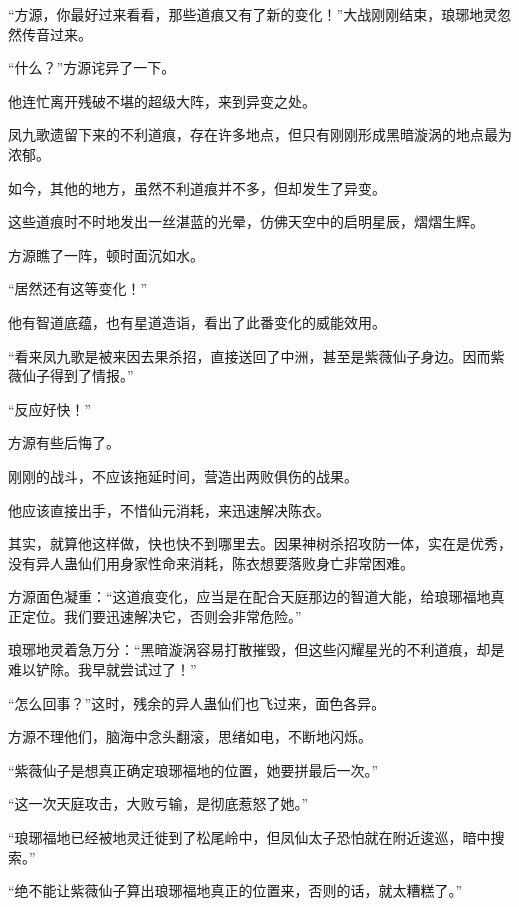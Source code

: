 
\begin{this_body}



“方源，你最好过来看看，那些道痕又有了新的变化！”大战刚刚结束，琅琊地灵忽然传音过来。

“什么？”方源诧异了一下。

他连忙离开残破不堪的超级大阵，来到异变之处。

凤九歌遗留下来的不利道痕，存在许多地点，但只有刚刚形成黑暗漩涡的地点最为浓郁。

如今，其他的地方，虽然不利道痕并不多，但却发生了异变。

这些道痕时不时地发出一丝湛蓝的光晕，仿佛天空中的启明星辰，熠熠生辉。

方源瞧了一阵，顿时面沉如水。

“居然还有这等变化！”

他有智道底蕴，也有星道造诣，看出了此番变化的威能效用。

“看来凤九歌是被来因去果杀招，直接送回了中洲，甚至是紫薇仙子身边。因而紫薇仙子得到了情报。”

“反应好快！”

方源有些后悔了。

刚刚的战斗，不应该拖延时间，营造出两败俱伤的战果。

他应该直接出手，不惜仙元消耗，来迅速解决陈衣。

其实，就算他这样做，快也快不到哪里去。因果神树杀招攻防一体，实在是优秀，没有异人蛊仙们用身家性命来消耗，陈衣想要落败身亡非常困难。

方源面色凝重：“这道痕变化，应当是在配合天庭那边的智道大能，给琅琊福地真正定位。我们要迅速解决它，否则会非常危险。”

琅琊地灵着急万分：“黑暗漩涡容易打散摧毁，但这些闪耀星光的不利道痕，却是难以铲除。我早就尝试过了！”

“怎么回事？”这时，残余的异人蛊仙们也飞过来，面色各异。

方源不理他们，脑海中念头翻滚，思绪如电，不断地闪烁。

“紫薇仙子是想真正确定琅琊福地的位置，她要拼最后一次。”

“这一次天庭攻击，大败亏输，是彻底惹怒了她。”

“琅琊福地已经被地灵迁徙到了松尾岭中，但凤仙太子恐怕就在附近逡巡，暗中搜索。”

“绝不能让紫薇仙子算出琅琊福地真正的位置来，否则的话，就太糟糕了。”


\end{this_body}
